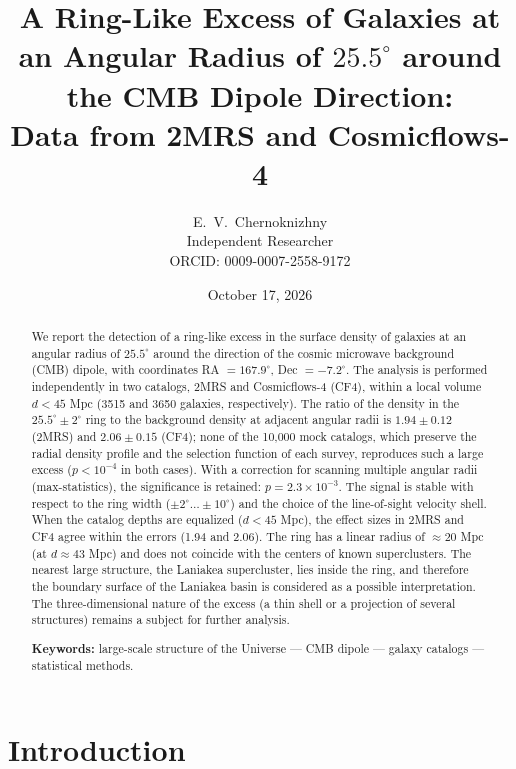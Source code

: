 \documentclass[11pt,a4paper]{article}
\title{\bfseries A Ring-Like Excess of Galaxies at an Angular Radius of \(25.5^\circ\) around the CMB Dipole Direction:\\ Data from 2MRS and Cosmicflows-4}
\author{E.~V.~Chernoknizhny\\ \small Independent Researcher\\ \small ORCID: 0009-0007-2558-9172}
\date{October 17, 2026}
\begin{document}
\maketitle

\begin{abstract}
We report the detection of a ring-like excess in the surface density of galaxies
at an angular radius of \(25.5^\circ\) around the direction of the cosmic microwave
background (CMB) dipole, with coordinates RA \(= 167.9^\circ\),
Dec \(= -7.2^\circ\). The analysis is performed independently in two catalogs,
2MRS and Cosmicflows-4 (CF4), within a local volume \(d < 45\) Mpc
(3515 and 3650 galaxies, respectively).
The ratio of the density in the \(25.5^\circ \pm 2^\circ\) ring to the background
density at adjacent angular radii is \(1.94 \pm 0.12\) (2MRS) and
\(2.06 \pm 0.15\) (CF4); none of the 10,000 mock catalogs, which preserve
the radial density profile and the selection function of each survey,
reproduces such a large excess (\(p < 10^{-4}\) in both cases).
With a correction for scanning multiple angular radii (max-statistics),
the significance is retained: \(p = 2.3 \times 10^{-3}\).
The signal is stable with respect to the ring width
(\(\pm 2^\circ \dots \pm 10^\circ\)) and the choice of the line-of-sight velocity shell.
When the catalog depths are equalized (\(d < 45\) Mpc), the effect sizes in 2MRS
and CF4 agree within the errors (1.94 and 2.06).
The ring has a linear radius of \(\approx 20\) Mpc (at \(d \approx 43\) Mpc)
and does not coincide with the centers of known superclusters.
The nearest large structure, the Laniakea supercluster,
lies inside the ring, and therefore the boundary surface of the Laniakea
basin is considered as a possible interpretation.
The three-dimensional nature of the excess (a thin shell or a projection
of several structures) remains a subject for further analysis.

\vspace{6pt}
\noindent\textbf{Keywords:} large-scale structure of the Universe ---
CMB dipole --- galaxy catalogs --- statistical methods.
\end{abstract}

\tableofcontents
\newpage

\section{Introduction}
\end{document}
